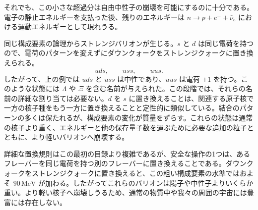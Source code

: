 それでも、この小さな超過分は自由中性子の崩壊を可能にするのに十分である。電子の静止エネルギーを支払った後、残りのエネルギーは \(n\to p+e^-+\bar\nu_e\) における運動エネルギーとして現れうる。

同じ構成要素の論理からストレンジバリオンが生じる。\(s\) と \(d\) は同じ電荷を持つので、電荷のパターンを変えずにダウンクォークをストレンジクォークに置き換えられる。
\begin{equation}
uds,\qquad uss,\qquad uus.
\end{equation}
したがって、上の例では \(uds\) と \(uss\) は中性であり、\(uus\) は電荷 \(+1\) を持つ。このような状態には \(\Lambda\) や \(\Xi\) を含む名前が与えられた。この段階では、それらの名前の詳細な割り当ては必要ない。\(d\) を \(s\) に置き換えることは、関連する原子核で一方の核子種をもう一方に置き換えることと定性的に類似している。結合のパターンの多くは保たれるが、構成要素の変化が質量をずらす。これらの状態は通常の核子より重く、エネルギーと他の保存量子数を運ぶために必要な追加の粒子とともに、より軽いバリオンへ崩壊する。

\begin{classroomqa}
\end{classroomqa}

詳細な置換規則はこの最初の目録より複雑であるが、安全な操作の1つは、あるフレーバーを同じ電荷を持つ別のフレーバーに置き換えることである。ダウンクォークをストレンジクォークに置き換えると、この粗い構成要素の水準ではおよそ \(90\,\mathrm{MeV}\) が加わる。したがってこれらのバリオンは陽子や中性子よりいくらか重い。より軽い核子へ崩壊しうるため、通常の物質中や我々の周囲の宇宙には豊富には存在しない。

\begin{classroomqa}
\end{classroomqa}

\begin{classroomqa}
\end{classroomqa}

